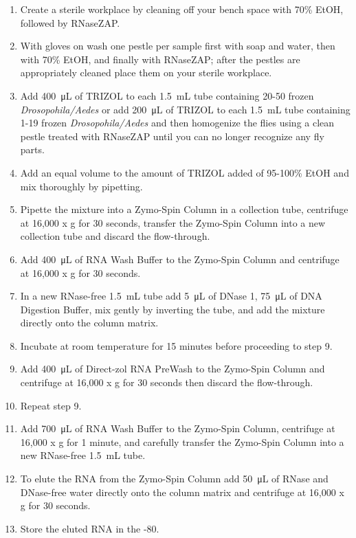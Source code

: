 \documentclass[a4paper,12pt]{article}
\begin{document}
\begin{enumerate}

\item Create a sterile workplace by cleaning off your bench space with 70\% EtOH, followed by RNaseZAP.
\item With gloves on wash one pestle per sample first with soap and water, then with 70\% EtOH, and finally with RNaseZAP; after the pestles are appropriately cleaned place them on your sterile workplace.
\item Add \SI{400}{\micro\liter} of TRIZOL to each \SI{1.5}{\milli\liter} tube containing 20-50 frozen \textit{Drosopohila/Aedes} or add \SI{200}{\micro\liter} of TRIZOL to each \SI{1.5}{\milli\liter} tube containing 1-19 frozen \textit{Drosopohila/Aedes} and then homogenize the flies using a clean pestle treated with RNaseZAP until you can no longer recognize any fly parts.  
\item Add an equal volume to the amount of TRIZOL added of 95-100\% EtOH and mix thoroughly by pipetting.
\item Pipette the mixture into a Zymo-Spin Column in a collection tube, centrifuge at 16,000 x g for 30 seconds, transfer the Zymo-Spin Column into a new collection tube and discard the flow-through. 
\item Add \SI{400}{\micro\liter} of RNA Wash Buffer to the  Zymo-Spin Column and centrifuge at 16,000 x g for 30 seconds.
\item In a new RNase-free \SI{1.5}{\milli\liter} tube add \SI{5}{\micro\liter} of DNase 1,  \SI{75}{\micro\liter} of DNA Digestion Buffer, mix gently by inverting the tube, and add the mixture directly onto the column matrix. 
\item Incubate at room temperature for 15 minutes before proceeding to step 9.
\item Add \SI{400}{\micro\liter} of Direct-zol RNA PreWash to the Zymo-Spin Column and centrifuge at 16,000 x g for 30 seconds then discard the flow-through.
\item Repeat step 9.
\item Add \SI{700}{\micro\liter} of RNA Wash Buffer to the Zymo-Spin Column, centrifuge at 16,000 x g for 1 minute, and carefully transfer the Zymo-Spin Column into a  new RNase-free \SI{1.5}{\milli\liter} tube.
\item To elute the RNA from the Zymo-Spin Column add \SI{50}{\micro\liter} of RNase and DNase-free water directly onto the column matrix and centrifuge at 16,000 x g for 30 seconds.
\item Store the eluted RNA in the -80. 
\end{enumerate}
\end{document}
